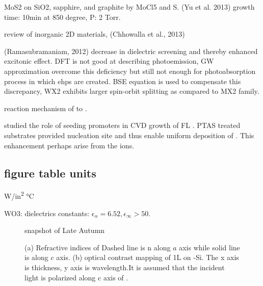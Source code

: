MoS2 on SiO2, sapphire, and graphite by MoCl5 and S. (Yu et al. 2013)
growth time: 10min at 850 degree, P: 2 Torr.


review of inorganic 2D materials, (Chhowalla et al., 2013)

(Ramasubramaniam, 2012) decrease in dielectric screening and thereby enhanced excitonic effect.
DFT is not good at describing photoemission, GW approximation overcome this deficiency but still not enough for photoabsorption process in which ehps are created. BSE equation is used to compensate this discrepancy,
WX2 exhibits larger spin-orbit splitting as compared to MX2 family.

reaction mechanism of  to .\cite{Weber1996}


\citeauthor{Ling2014} studied the role of seeding promoters in CVD growth of FL .\cite{Ling2014} PTAS treated substrates provided nucleation site and thus enable uniform deposition of .  This enhancement perhaps arise from the  ions.


\subsection{figure table units}
\si{W/in^2}
\si{\degreeCelsius}

 WO3: dielectrics constants: $\epsilon_\alpha = 6.52,\epsilon_\infty > 50$. \cite{Deb2008}
\begin{figure}[htb]
\centering
{}\hspace{0.04\textwidth}

\caption{snapshot of Late Autumn}
\label{fig:tw}
\end{figure}

\begin{figure}[htb]
\centering
{}%
\caption[Refractive indices of ]{(a) Refractive indices of  Dashed line is n along $a$ axis while solid line is along $c$ axis. (b) optical contrast mapping of 1L  on -Si. The x axis is  thickness, y axis is wavelength.It is assumed that the incident light is polarized along c axis of .}
\label{fig:mofl}
\end{figure}


